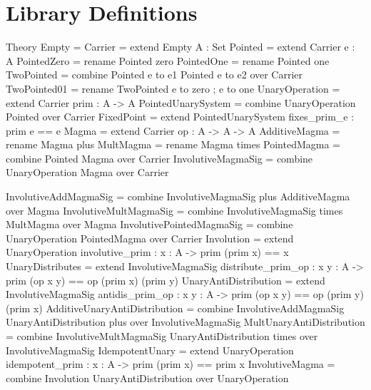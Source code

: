 \chapter{Library Definitions}
\label{appendix:input}

\begin{togcode}
Theory Empty = {} 
Carrier = extend Empty {A : Set}
Pointed = extend Carrier {e : A}
PointedZero = rename Pointed zero
PointedOne  = rename Pointed one 
TwoPointed = combine Pointed {e to e1} Pointed {e to e2} over Carrier 
TwoPointed01 = rename TwoPointed {e to zero ; e to one} 
UnaryOperation = extend Carrier {prim : A -> A}
PointedUnarySystem = combine UnaryOperation {} Pointed {} over Carrier
FixedPoint = extend PointedUnarySystem {fixes_prim_e : prim e == e} 
Magma = extend Carrier {op : A -> A -> A}
AdditiveMagma = rename Magma plus
MultMagma = rename Magma times 
PointedMagma = combine Pointed {} Magma {} over Carrier
InvolutiveMagmaSig = 
  combine UnaryOperation {} Magma {} over Carrier
\end{togcode}

\begin{togcode} 
InvolutiveAddMagmaSig = 
  combine InvolutiveMagmaSig plus AdditiveMagma {} over Magma
InvolutiveMultMagmaSig = 
  combine InvolutiveMagmaSig times MultMagma {} over Magma 
InvolutivePointedMagmaSig = 
  combine UnaryOperation {} PointedMagma {} over Carrier 
Involution = 
  extend UnaryOperation {involutive_prim : {x : A} -> prim (prim x) == x} 
UnaryDistributes =
  extend InvolutiveMagmaSig 
     {distribute_prim_op : {x y : A} -> 
         prim (op x y) == op (prim x) (prim y) }
UnaryAntiDistribution =
  extend InvolutiveMagmaSig 
     {antidis_prim_op : {x y : A} -> 
         prim (op x y) == op (prim y) (prim x) }
AdditiveUnaryAntiDistribution =
  combine InvolutiveAddMagmaSig {} UnaryAntiDistribution plus 
  over InvolutiveMagmaSig
MultUnaryAntiDistribution =
  combine InvolutiveMultMagmaSig {} UnaryAntiDistribution times 
  over InvolutiveMagmaSig   
IdempotentUnary =
  extend UnaryOperation 
     {idempotent_prim : {x : A} -> prim (prim x) == prim x}
InvolutiveMagma = 
  combine Involution {} UnaryAntiDistribution {} over UnaryOperation  
\end{togcode} 

